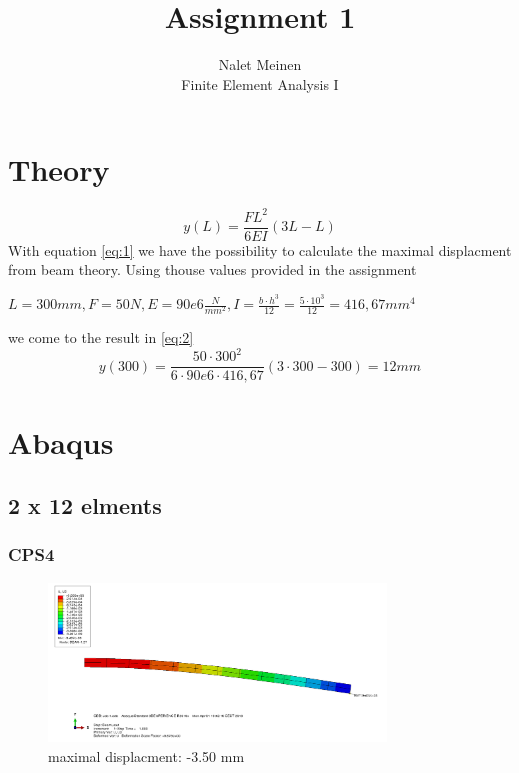 \documentclass[12pt]{article}
\begin{document}


\title{Assignment 1}%
\author{Nalet Meinen\\ %
Finite Element Analysis I
}

\maketitle

\section{Theory}

\begin{equation}\label{eq:1}
y(L) = \frac{FL^{2}}{6EI}(3L-L)
\end{equation}
With equation \ref{eq:1} we have the possibility to calculate the maximal displacment from beam theory.
Using thouse values provided in the assignment

$L = 300mm, F = 50N, E = 90e6 \frac{N}{mm^{2}}, I = \frac{b\cdot h^{3}}{12} = \frac{5\cdot 10^{3}}{12} =  416,67mm^{4} $ 

we come to the result in \ref{eq:2}
\begin{equation}\label{eq:2}
y(300) = \frac{50 \cdot 300^{2}}{6\cdot 90e6 \cdot 416,67}(3\cdot300-300) = 12mm
\end{equation}
\pagebreak
\section{Abaqus}

\subsection{2 x 12 elments}

\subsubsection{CPS4}
\begin{figure}[!htb]
  \centering
  \includegraphics[width=0.8\textwidth]{pics/2_12_CPS4}
  \caption{maximal displacment: -3.50 mm}
\end{figure}
\FloatBarrier
\end{document}
